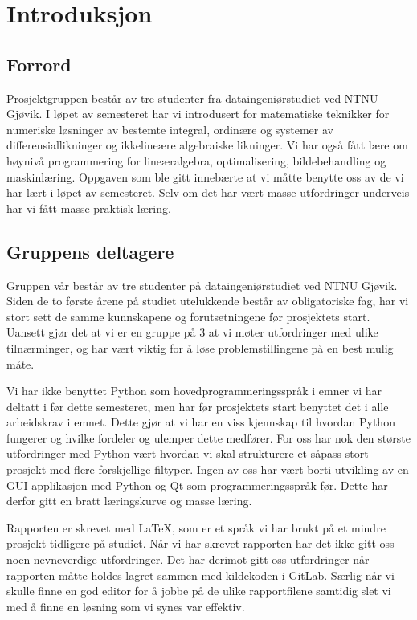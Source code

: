 \section{Introduksjon}

\subsection{Forrord}
Prosjektgruppen består av tre studenter fra dataingeniørstudiet ved NTNU Gjøvik. I løpet av 
semesteret har vi introdusert for matematiske teknikker for numeriske løsninger av bestemte 
integral, ordinære og systemer av differensiallikninger og ikkelineære algebraiske likninger. 
Vi har også fått lære om høynivå programmering for lineæralgebra, optimalisering, bildebehandling 
og maskinlæring. Oppgaven som ble gitt innebærte at vi måtte benytte oss av de vi har lært i løpet
av semesteret. Selv om det har vært masse utfordringer underveis har vi fått masse praktisk 
læring. 

\subsection{Gruppens deltagere}
Gruppen vår består av tre studenter på dataingeniørstudiet ved NTNU Gjøvik. Siden de to første årene på studiet utelukkende består av obligatoriske fag, har vi stort sett de samme kunnskapene og forutsetningene før prosjektets start. Uansett gjør det at vi er en gruppe på 3 at vi møter utfordringer med ulike tilnærminger, og har vært viktig for å løse problemstillingene på en best mulig måte.

Vi har ikke benyttet Python som hovedprogrammeringsspråk i emner vi har deltatt i før dette semesteret, men har før prosjektets start benyttet det i alle arbeidskrav i emnet. Dette gjør at vi har en viss kjennskap til hvordan Python fungerer og hvilke fordeler og ulemper dette medfører. For oss har nok den største utfordringer med Python vært hvordan vi skal strukturere et såpass stort prosjekt med flere forskjellige filtyper. Ingen av oss har vært borti utvikling av en GUI-applikasjon med Python og Qt som programmeringsspråk før. Dette har derfor gitt en bratt læringskurve og masse læring.

Rapporten er skrevet med LaTeX, som er et språk vi har brukt på et mindre prosjekt tidligere på studiet. Når vi har skrevet rapporten har det ikke gitt oss noen nevneverdige utfordringer. Det har derimot gitt oss utfordringer når rapporten måtte holdes lagret sammen med kildekoden i GitLab. Særlig når vi skulle finne en god editor for å jobbe på de ulike rapportfilene samtidig slet vi med å finne en løsning som vi synes var effektiv.

